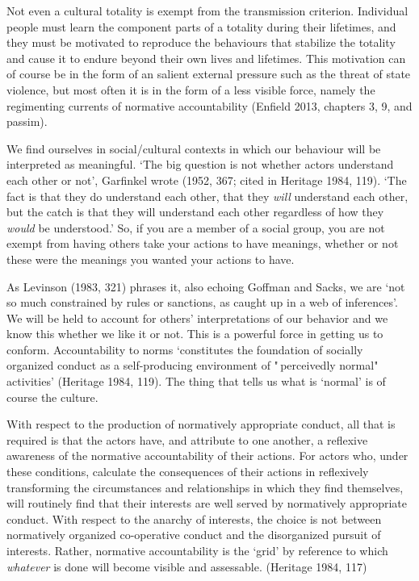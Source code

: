 Not even a cultural totality is exempt from the transmission criterion. 
Individual people must learn the component parts of a totality during 
their lifetimes, and they must be motivated to reproduce the behaviours 
that stabilize the totality and cause it to endure beyond their own 
lives and lifetimes. This motivation can of course be in the form of an 
salient external pressure such as the threat of state violence, but most 
often it is in the form of a less visible force, namely the regimenting 
currents of normative accountability (Enfield 2013, chapters 3, 9, and 
passim). 



We find ourselves in social/cultural contexts in which our behaviour 
will be interpreted as meaningful. \textquoteleft The big question is not whether 
actors understand each other or not', Garfinkel wrote (1952, 367; cited 
in Heritage 1984, 119). \textquoteleft The fact is that they do understand each other, 
that they \textit{will} understand each other, but the catch is that 
they will understand each other regardless of how they \textit{would} 
be understood.' So, if you are a member of a social group, you are not 
exempt from having others take your actions to have meanings, whether or 
not these were the meanings you wanted your actions to have. 



As Levinson (1983, 321) phrases it, also echoing Goffman and Sacks, we 
are \textquoteleft not so much constrained by rules or sanctions, as caught up in a 
web of inferences'. We will be held to account for others' 
interpretations of our behavior and we know this whether we like it or 
not. This is a powerful force in getting us to conform. Accountability 
to norms \textquoteleft constitutes the foundation of socially organized conduct as a 
self-producing environment of "\,perceivedly normal" activities' 
(Heritage 1984, 119). The thing that tells us what is \textquoteleft normal' is of 
course the culture. 



With respect to the production of normatively appropriate conduct, all 
that is required is that the actors have, and attribute to one another, 
a reflexive awareness of the normative accountability of their actions. 
For actors who, under these conditions, calculate the consequences of 
their actions in reflexively transforming the circumstances and 
relationships in which they find themselves, will routinely find that 
their interests are well served by normatively appropriate conduct. With 
respect to the anarchy of interests, the choice is not between 
normatively organized co-operative conduct and the disorganized pursuit 
of interests. Rather, normative accountability is the \textquoteleft grid' by 
reference to which \textit{whatever} is done will become visible and 
assessable. (Heritage 1984, 117)



